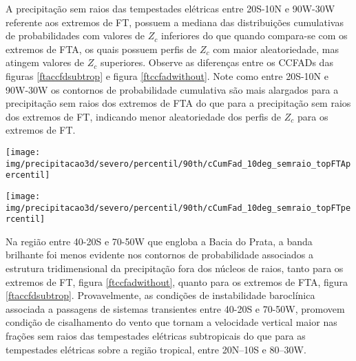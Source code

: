 A precipitação sem raios das tempestades elétricas entre 20S-10N e 90W-30W referente aos extremos de FT, possuem a mediana das distribuições cumulativas de probabilidades com valores de $Z_c$ inferiores do que quando compara-se com os extremos de FTA, os quais possuem perfis de $Z_c$ com maior aleatoriedade, mas atingem valores de $Z_c$ superiores. Observe as diferenças entre os CCFADs das figuras \ref{ftaccfdsubtrop} e figura \ref{ftccfadwithout}. Note como entre 20S-10N e 90W-30W os contornos de probabilidade cumulativa são mais alargados para a precipitação sem raios dos extremos de FTA do que para a precipitação sem raios dos extremos de FT, indicando menor aleatoriedade dos perfis de $Z_c$ para os extremos de FT.

\begin{sidewaysfigure}%
  \centering
  \texttt{[image: img/precipitacao3d/severo/percentil/90th/cCumFad\_10deg\_semraio\_topFTApercentil]}
  \caption{CCFDs para os extremos de FTA. Porção da precipitação sem raios.}
  \label{ftaccfdsubtrop}   
\end{sidewaysfigure} 

\begin{sidewaysfigure}%
  \centering
  \texttt{[image: img/precipitacao3d/severo/percentil/90th/cCumFad\_10deg\_semraio\_topFTpercentil]}
  \caption{CCFDs para os extremos de FT. Porção da precipitação sem raios.}
  \label{ftccfadwithout}   
\end{sidewaysfigure} 




Na região entre 40-20S e 70-50W que engloba a Bacia do Prata, a banda brilhante foi menos evidente nos contornos de probabilidade associados a estrutura tridimensional da precipitação fora dos núcleos de raios, tanto para os extremos de FT, figura \ref{ftccfadwithout}, quanto para os extremos de FTA, figura \ref{ftaccfdsubtrop}. Provavelmente, as condições de instabilidade baroclínica associada a passagens de sistemas transientes  entre 40-20S e 70-50W, promovem condição de cisalhamento do vento que tornam a velocidade vertical maior nas frações sem raios das tempestades elétricas subtropicais do que para as tempestades elétricas sobre a região tropical, entre 20N--10S e 80--30W.


